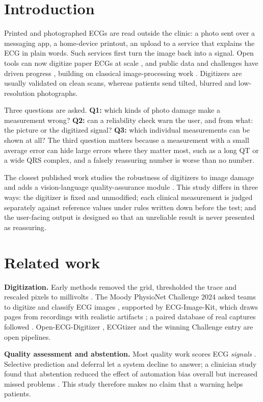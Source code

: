 \documentclass[11pt,a4paper]{article}
\begin{document}
\section{Introduction}
Printed and photographed ECGs are read outside the clinic: a photo sent over a messaging app, a home-device printout, an upload to a service that explains the ECG in plain words. Such services first turn the image back into a signal. Open tools can now digitize paper ECGs at scale \citep{ref5,ref3,ref53}, and public data and challenges have driven progress \citep{ref1,ref2,ref4}, building on classical image-processing work \citep{ref6,ref9}. Digitizers are usually validated on clean scans, whereas patients send tilted, blurred and low-resolution photographs.

Three questions are asked. \textbf{Q1:} which kinds of photo damage make a measurement wrong? \textbf{Q2:} can a reliability check warn the user, and from what: the picture or the digitized signal? \textbf{Q3:} which individual measurements can be shown at all? The third question matters because a measurement with a small average error can hide large errors where they matter most, such as a long QT or a wide QRS complex, and a falsely reassuring number is worse than no number.

The closest published work studies the robustness of digitizers to image damage \citep{ref54} and adds a vision-language quality-assurance module \citep{ref55}. This study differs in three ways: the digitizer is fixed and unmodified; each clinical measurement is judged separately against reference values under rules written down before the test; and the user-facing output is designed so that an unreliable result is never presented as reassuring.

\section{Related work}
\textbf{Digitization.} Early methods removed the grid, thresholded the trace and rescaled pixels to millivolts \citep{ref6,ref9}. The Moody PhysioNet Challenge 2024 asked teams to digitize and classify ECG images \citep{ref2}, supported by ECG-Image-Kit, which draws pages from recordings with realistic artifacts \citep{ref1}; a paired database of real captures followed \citep{ref4}. Open-ECG-Digitizer \citep{ref5}, ECGtizer \citep{ref3} and the winning Challenge entry \citep{ref53} are open pipelines.

\textbf{Quality assessment and abstention.} Most quality work scores ECG \emph{signals} \citep{ref12,ref13,ref14}. Selective prediction and deferral \citep{ref23,ref24} let a system decline to answer; a clinician study found that abstention reduced the effect of automation bias overall but increased missed problems \citep{ref26}. This study therefore makes no claim that a warning helps patients.
\end{document}
